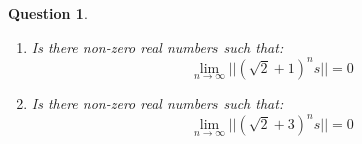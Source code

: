 \documentclass[a4paper,12pt]{article}
\newtheorem{ques}{Question}
\begin{document}



\newpage
\begin{ques}
    \begin{enumerate}
        \item Is there non-zero real number$s$ such that:
              \begin{equation*}
                  \lim_{n\to \infty}||(\sqrt{2}+1)^n s||=0
              \end{equation*}
        \item Is there non-zero real number$s$ such that:
              \begin{equation*}
                  \lim_{n\to \infty}||(\sqrt{2}+3)^n s||=0
              \end{equation*}
    \end{enumerate}
\end{ques}
\end{document}
